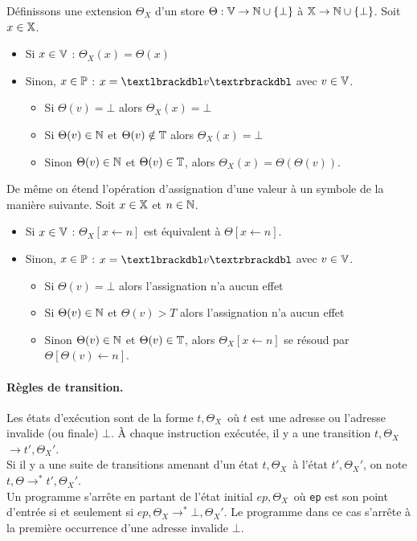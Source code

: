\begin{defi}
 Définissons une extension $\Theta_X$ d'un store $\Theta : \mathbb V\rightarrow\mathbb N\cup\{\bot\}$ à $\mathbb X\rightarrow\mathbb N\cup\{\bot\}$. Soit $x\in\mathbb X$.
 \begin{itemize}
  \item Si $x\in\mathbb V$ : $\Theta_X(x)=\Theta(x)$
  \item Sinon, $x\in\mathbb P$ : $x=\textlbrackdbl v\textrbrackdbl$ avec $v\in\mathbb V$.
  \begin{itemize}
   \item Si $\Theta(v)=\bot$ alors $\Theta_X(x)=\bot$
   \item Si $\Theta(v)\in\mathbb N$ et $\Theta(v)\notin\mathbb T$ alors $\Theta_X(x)=\bot$
   \item Sinon $\Theta(v)\in\mathbb N$ et $\Theta(v)\in\mathbb T$, alors $\Theta_X(x)=\Theta(\Theta(v))$.
  \end{itemize}
 \end{itemize}
  De même on étend l'opération d'assignation d'une valeur à un symbole de la manière suivante. Soit $x\in\mathbb X$ et $n\in\mathbb N$.
  \begin{itemize}
  \item Si $x\in\mathbb V$ : $\Theta_X[x\leftarrow n]$ est équivalent à $\Theta[x\leftarrow n]$.
  \item Sinon, $x\in\mathbb P$ : $x=\textlbrackdbl v\textrbrackdbl$ avec $v\in\mathbb V$.
    \begin{itemize}
   \item Si $\Theta(v)=\bot$ alors l'assignation n'a aucun effet
   \item Si $\Theta(v)\in\mathbb N$ et $\Theta(v)>T$ alors l'assignation n'a aucun effet
   \item Sinon $\Theta(v)\in\mathbb N$ et $\Theta(v)\in\mathbb T$, alors $\Theta_X[x\leftarrow n]$ se résoud par $\Theta[\Theta(v)\leftarrow n]$.
  \end{itemize}
  \end{itemize}
\label{sem_store_dynamique_pointeurs}
\end{defi}

\paragraph{Règles de transition.}
Les états d'exécution sont de la forme \textlangle$t, \Theta_X$\textrangle\ où $t$ est une adresse ou l'adresse invalide (ou finale) $\bot$. À chaque instruction exécutée, il y a une transition \textlangle$t, \Theta_X$\textrangle$\rightarrow$\textlangle$t', \Theta_X'$\textrangle.\\
Si il y a une suite de transitions amenant d'un état \textlangle$t, \Theta_X$\textrangle\ à l'état \textlangle$t', \Theta_X'$\textrangle, on note \textlangle$t, \Theta$\textrangle$\rightarrow^*$\textlangle$t', \Theta_X'$\textrangle.\\
Un programme s'arrête en partant de l'état initial \textlangle$ep, \Theta_X$\textrangle\ où \texttt{ep} est son point d'entrée si et seulement si \textlangle$ep, \Theta_X$\textrangle$\rightarrow^*$\textlangle$\bot, \Theta_X'$\textrangle. Le programme dans ce cas s'arrête à la première occurrence d'une adresse invalide $\bot$.

